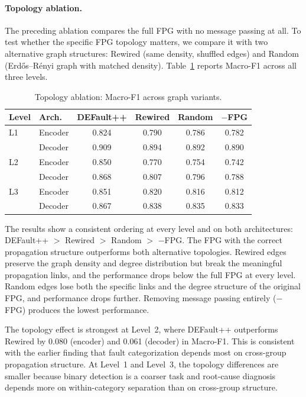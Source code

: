 \paragraph{Topology ablation.} The preceding ablation compares the full FPG with no message passing at all. To test whether the specific FPG topology matters, we compare it with two alternative graph structures: Rewired (same density, shuffled edges) and Random (Erd\H{o}s--R\'{e}nyi graph with matched density). Table~\ref{tab:abl_topology} reports Macro-F1 across all three levels.

\begin{table}[t]
\centering
\caption{Topology ablation: Macro-F1 across graph variants.}
\label{tab:abl_topology}
\small
\begin{tabular}{@{} l l c c c c @{}}
\toprule
\textbf{Level} & \textbf{Arch.} & \textbf{DEFault++} & \textbf{Rewired} & \textbf{Random} & \textbf{$-$FPG} \\
\midrule
L1 & Encoder & 0.824 & 0.790 & 0.786 & 0.782 \\
   & Decoder & 0.909 & 0.894 & 0.892 & 0.890 \\
\midrule
L2 & Encoder & 0.850 & 0.770 & 0.754 & 0.742 \\
   & Decoder & 0.868 & 0.807 & 0.796 & 0.788 \\
\midrule
L3 & Encoder & 0.851 & 0.820 & 0.816 & 0.812 \\
   & Decoder & 0.867 & 0.838 & 0.835 & 0.833 \\
\bottomrule
\end{tabular}
\end{table}

The results show a consistent ordering at every level and on both architectures: DEFault++ $>$ Rewired $>$ Random $>$ $-$FPG. The FPG with the correct propagation structure outperforms both alternative topologies. Rewired edges preserve the graph density and degree distribution but break the meaningful propagation links, and the performance drops below the full FPG at every level. Random edges lose both the specific links and the degree structure of the original FPG, and performance drops further. Removing message passing entirely ($-$FPG) produces the lowest performance.

The topology effect is strongest at Level~2, where DEFault++ outperforms Rewired by 0.080 (encoder) and 0.061 (decoder) in Macro-F1. This is consistent with the earlier finding that fault categorization depends most on cross-group propagation structure. At Level~1 and Level~3, the topology differences are smaller because binary detection is a coarser task and root-cause diagnosis depends more on within-category separation than on cross-group structure.

